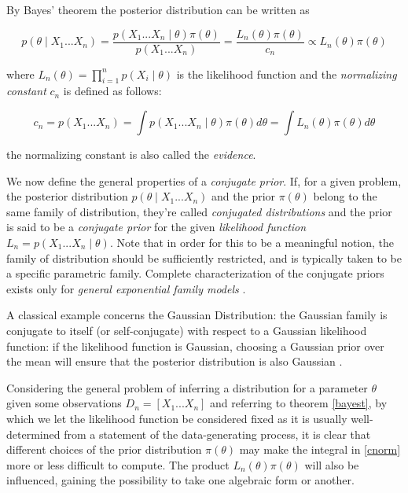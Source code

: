 \documentclass[12pt,openright,twoside,a4paper]{book}
\begin{document}
By Bayes' theorem the posterior distribution can be written as 

\begin{equation}
p(\theta\mid X_1...X_n)= \frac{p(X_1...X_n\mid \theta)\pi(\theta)}{p(X_1...X_n)}=\frac{L_n(\theta)\pi(\theta)}{c_n}\propto L_n(\theta)\pi(\theta)
\label{bayest}
\end{equation}

where $L_n(\theta)=\prod_{i=1}^n p(X_i\mid \theta)$ is the likelihood function and the \textit{normalizing constant} $c_n$ is defined as follows:

\begin{equation}
c_n=p(X_1...X_n)=\int p(X_1...X_n\mid \theta)\pi(\theta)d\theta=\int L_n(\theta)\pi(\theta)d\theta
\label{cnorm}
\end{equation}

the normalizing constant is also called the \textit{evidence}.

We now define the general properties of a \textit{conjugate prior}.
If, for a given problem, the posterior distribution $p(\theta\mid X_1...X_n)$ and the prior $\pi(\theta)$ belong to the same family of distribution, they're called \textit{conjugated distributions} and the prior is said to be a \textit{conjugate prior} for the given \textit{likelihood function} $L_n=p(X_1...X_n\mid \theta)$.
Note that in order for this to be a meaningful notion, the family of distribution should be sufficiently restricted, and is typically taken to be a specific parametric family.
Complete characterization of the conjugate priors exists only for \textit{general exponential family models} \cite{SML}.
 
A classical example concerns the Gaussian Distribution: the Gaussian family is conjugate to itself (or self-conjugate) with respect to a Gaussian likelihood function: if the likelihood function is Gaussian, choosing a Gaussian prior over the mean will ensure that the posterior distribution is also Gaussian \cite{CBA}.

Considering the general problem of inferring a distribution for a parameter $\theta$ given some observations $D_n=[X_1...X_n]$ and referring to theorem \ref{bayest}, by which we let the likelihood function be considered fixed as it is usually well-determined from a statement of the data-generating process,  it is clear that different choices of the prior distribution $\pi(\theta)$ may make the integral in \ref{cnorm} more or less difficult to compute.
The product $L_n(\theta)\pi(\theta)$ will also be influenced, gaining the possibility to take one algebraic form or another.
\end{document}
